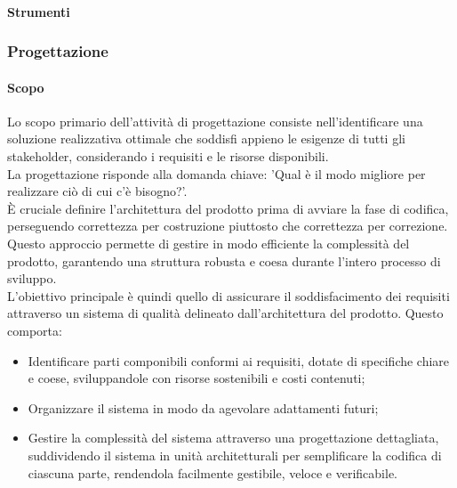 \paragraph{Strumenti} 

\subsubsection{Progettazione}

\paragraph{Scopo}
Lo scopo primario dell'attività di progettazione consiste nell'identificare una soluzione realizzativa ottimale che soddisfi appieno le esigenze di tutti gli stakeholder, considerando i requisiti e le risorse disponibili. \\
La progettazione risponde alla domanda chiave: 'Qual è il modo migliore per realizzare ciò di cui c'è bisogno?'. \\
È cruciale definire l'architettura del prodotto prima di avviare la fase di codifica, perseguendo correttezza per costruzione piuttosto che correttezza per correzione. Questo approccio permette di gestire in modo efficiente la complessità del prodotto, garantendo una struttura robusta e coesa durante l'intero processo di sviluppo. \\
L'obiettivo principale è quindi quello di assicurare il soddisfacimento dei requisiti attraverso un sistema di qualità delineato dall'architettura del prodotto. Questo comporta:
\begin{itemize}
    \item Identificare parti componibili conformi ai requisiti, dotate di specifiche chiare e coese, sviluppandole con risorse sostenibili e costi contenuti;
    \item Organizzare il sistema in modo da agevolare adattamenti futuri;
    \item Gestire la complessità del sistema attraverso una progettazione dettagliata, suddividendo il sistema in unità architetturali per semplificare la codifica di ciascuna parte, rendendola facilmente gestibile, veloce e verificabile.
\end{itemize}

